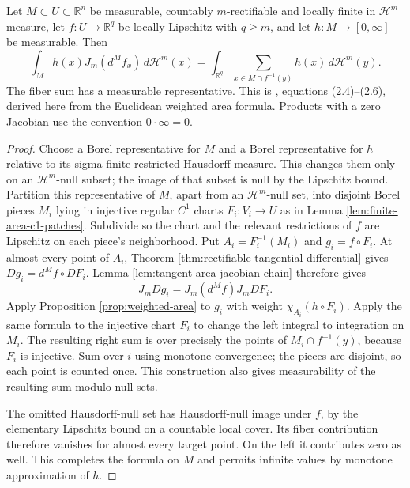 \begin{theorem}\label{thm:rectifiable-weighted-area-local}
Let $M\subset U\subset\mathbb R^n$ be measurable, countably $m$-rectifiable and locally finite in $\mathcal H^m$ measure, let $f:U\to\mathbb R^q$ be locally Lipschitz with $q\geq m$, and let $h:M\to[0,\infty]$ be measurable. Then
\[
 \int_M h(x)J_m(d^Mf_x)\,d\mathcal H^m(x)
 =\int_{\mathbb R^q}\sum_{x\in M\cap f^{-1}(y)}h(x)\,d\mathcal H^m(y).
\]
The fiber sum has a measurable representative. This is \cite{Sim18}, equations (2.4)--(2.6), derived here from the Euclidean weighted area formula. Products with a zero Jacobian use the convention $0\cdot\infty=0$.
\end{theorem}
\begin{proof}
Choose a Borel representative for $M$ and a Borel representative for $h$ relative to its sigma-finite restricted Hausdorff measure. This changes them only on an $\mathcal H^m$-null subset; the image of that subset is null by the Lipschitz bound. Partition this representative of $M$, apart from an $\mathcal H^m$-null set, into disjoint Borel pieces $M_i$ lying in injective regular $C^1$ charts $F_i:V_i\to U$ as in Lemma \ref{lem:finite-area-c1-patches}. Subdivide so the chart and the relevant restrictions of $f$ are Lipschitz on each piece's neighborhood. Put $A_i=F_i^{-1}(M_i)$ and $g_i=f\circ F_i$. At almost every point of $A_i$, Theorem \ref{thm:rectifiable-tangential-differential} gives $Dg_i=d^Mf\circ DF_i$. Lemma \ref{lem:tangent-area-jacobian-chain} therefore gives
\[
 J_mDg_i=J_m(d^Mf)J_mDF_i.
\]
Apply Proposition \ref{prop:weighted-area} to $g_i$ with weight $\chi_{A_i}(h\circ F_i)$. Apply the same formula to the injective chart $F_i$ to change the left integral to integration on $M_i$. The resulting right sum is over precisely the points of $M_i\cap f^{-1}(y)$, because $F_i$ is injective. Sum over $i$ using monotone convergence; the pieces are disjoint, so each point is counted once. This construction also gives measurability of the resulting sum modulo null sets.

The omitted Hausdorff-null set has Hausdorff-null image under $f$, by the elementary Lipschitz bound on a countable local cover. Its fiber contribution therefore vanishes for almost every target point. On the left it contributes zero as well. This completes the formula on $M$ and permits infinite values by monotone approximation of $h$.
\end{proof}

